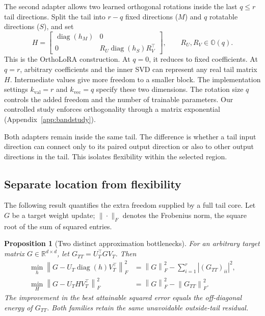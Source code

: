 \documentclass{article}
\newtheorem{proposition}{Proposition}
\newcommand{\diag}{\operatorname{diag}}
\newcommand{\fro}[1]{\left\|#1\right\|_F}
\begin{document}
The second adapter allows two learned orthogonal rotations inside the last $q\le r$ tail directions. Split the tail into $r-q$ fixed directions ($M$) and $q$ rotatable directions ($S$), and set
\begin{equation}
H=\begin{bmatrix}
\diag(h_M)&0\\0&R_U\diag(h_S)R_V^\top
\end{bmatrix},\qquad R_U,R_V\in\mathbb O(q).
\label{eq:rotations}
\end{equation}
This is the OrthoLoRA construction. At $q=0$, it reduces to fixed coefficients. At $q=r$, arbitrary coefficients and the inner SVD can represent any real tail matrix $H$. Intermediate values give more freedom to a smaller block. The implementation settings $k_{\mathrm{val}}=r$ and $k_{\mathrm{vec}}=q$ specify these two dimensions. The rotation size $q$ controls the added freedom and the number of trainable parameters. Our controlled study enforces orthogonality through a matrix exponential (Appendix~\ref{app:bandstudy}).

Both adapters remain inside the same tail. The difference is whether a tail input direction can connect only to its paired output direction or also to other output directions in the tail. This isolates flexibility within the selected region.

\subsection{Separate location from flexibility}
The following result quantifies the extra freedom supplied by a full tail core. Let $G$ be a target weight update; $\|\cdot\|_F$ denotes the Frobenius norm, the square root of the sum of squared entries.

\begin{proposition}[Two distinct approximation bottlenecks]
\label{prop:approximation}
For an arbitrary target matrix $G\in\mathbb R^{d\times d}$, let $G_{TT}=U_T^\top G V_T$. Then
\begin{align}
\min_h\fro{G-U_T\diag(h)V_T^\top}^2
&=\fro{G}^2-\sum_{i=1}^r |(G_{TT})_{ii}|^2,\label{eq:fixederror}\\
\min_H\fro{G-U_T H V_T^\top}^2
&=\fro{G}^2-\fro{G_{TT}}^2.\label{eq:fullerror}
\end{align}
The improvement in the best attainable squared error equals the off-diagonal energy of $G_{TT}$. Both families retain the same unavoidable outside-tail residual.
\end{proposition}
\end{document}
